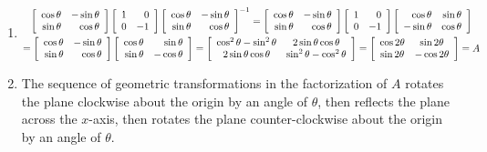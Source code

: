 \begin{enumerate}[!HW!, start=1]
\itemspade
\begin{enumerate}
\item 
\begin{multline*} \mtx{rr}{\cos \theta & -\sin \theta \\ \sin \theta & \cos \theta}\mtx{rr}{1 & 0 \\ 0 & -1}\mtx{rr}{\cos \theta & -\sin \theta \\ \sin \theta & \cos \theta}^{-1} = \mtx{rr}{\cos \theta & -\sin \theta \\ \sin \theta & \cos \theta}\mtx{rr}{1 & 0 \\ 0 & -1}\mtx{rr}{\cos \theta & \sin \theta \\ -\sin \theta & \cos \theta}\\
= \mtx{rr}{\cos \theta & -\sin \theta \\ \sin \theta & \cos \theta}\mtx{rr}{\cos \theta & \sin \theta \\ \sin \theta & -\cos \theta}
= \mtx{cc}{\cos^2\theta - \sin^2\theta & 2\sin\theta\cos\theta\\ 2\sin\theta\cos\theta & \sin^2\theta - \cos^2\theta}
= \mtx{cc}{\cos2\theta & \sin2\theta \\ \sin2\theta & -\cos2\theta} = A
\end{multline*} 
\item The sequence of geometric transformations in the factorization of $A$ rotates the plane clockwise about the origin by an angle of $\theta$, then reflects the plane across the $x$-axis, then rotates the plane counter-clockwise about the origin by an angle of $\theta$.\\


\end{enumerate}
\end{enumerate}
